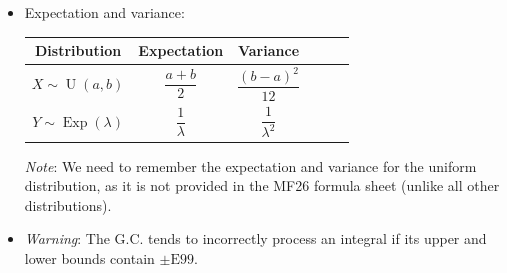 \documentclass[../Notes.tex]{subfiles}
\begin{document}
\begin{stbox}{}
  \begin{itemize}
    \item Expectation and variance:
    \begin{center}
      \begin{tabular}{|Sc|Sc|Sc|}
        \hline
        Distribution & Expectation & Variance\\
        \hline
        \(X\sim \operatorname{U}(a,b)\) & \(\dfrac{a+b}{2}\) & \(\dfrac{(b-a)^2}{12}\)\\
        \hline
        \(Y\sim \operatorname{Exp}(\lambda)\) & \(\dfrac{1}{\lambda}\) & \(\dfrac{1}{\lambda^2}\)\\
        \hline
      \end{tabular} 
    \end{center}
    \emph{Note}: We need to remember the expectation and variance for the uniform distribution, as it is not provided in the MF26 formula sheet (unlike all other distributions).
    \item \emph{Warning}: The G.C. tends to incorrectly process an integral if its upper and lower bounds contain \(\pm \text{E}99\).
  \end{itemize}
\end{stbox}
\end{document}
